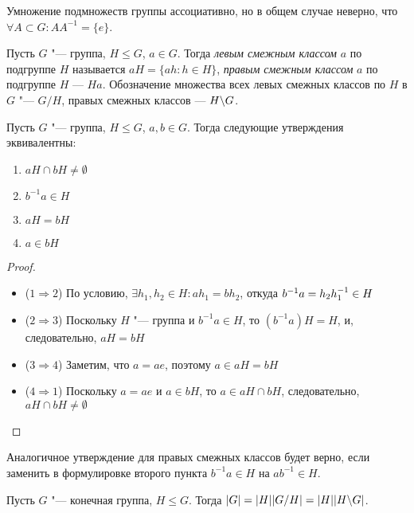 \begin{note}
	Умножение подмножеств группы ассоциативно, но в общем случае неверно, что $\forall A \subset G: AA^{-1} = \{e\}$.
\end{note}

\begin{definition}
	Пусть $G$ "--- группа, $H \le G$, $a \in G$. Тогда \textit{левым смежным классом} $a$ по подгруппе $H$ называется $aH = \{ah: h \in H\}$, \textit{правым смежным классом} $a$ по подгруппе $H$ --- $Ha$. Обозначение множества всех левых смежных классов по $H$ в $G$ "--- $G/H$, правых смежных классов --- $H\backslash G$.
\end{definition}

\begin{proposition}
	Пусть $G$ "--- группа, $H \le G$, $a, b \in G$. Тогда следующие утверждения эквивалентны:
	\begin{enumerate}
		\item $aH \cap bH \ne \emptyset$
		\item $b^{-1}a \in H$
		\item $aH = bH$
		\item $a \in bH$
	\end{enumerate}
\end{proposition}

\begin{proof}~
	\begin{itemize}
		\item ($1 \Rightarrow 2$) По условию, $\exists h_1, h_2 \in H: ah_1 = bh_2$, откуда $b^{-1}a \hm= h_2h_1^{-1} \in H$
		\item ($2 \Rightarrow 3$) Поскольку $H$ "--- группа и $b^{-1}a \in H$, то $(b^{-1}a)H = H$, и, следовательно, $aH = bH$
		\item ($3 \Rightarrow 4$) Заметим, что $a = ae$, поэтому $a \in aH = bH$
		\item ($4 \Rightarrow 1$) Поскольку $a = ae$ и $a \in bH$, то $a \in aH \cap bH$, следовательно, $aH \cap bH \ne \emptyset$
	\end{itemize}
\end{proof}

\begin{note}
	Аналогичное утверждение для правых смежных классов будет верно, если заменить в формулировке второго пункта $b^{-1}a \in H$ на $ab^{-1} \in H$.
\end{note}

\begin{theorem}[Лагранжа]
	Пусть $G$ "--- конечная группа, $H \le G$. Тогда $|G| = |H||G / H| \hm= |H||H \bs G|$.
\end{theorem}

